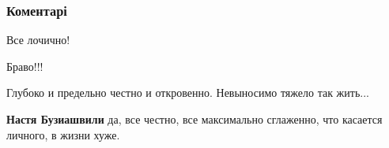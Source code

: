  
 
 
 
 
\subsubsection{Коментарі}
\label{sec:02_08_2021.fb.bilchenko_evgenia.5.kontr_kultura.cmt}

\begin{itemize}
 
Все лочично!

 
Браво!!!

 
Глубоко и предельно честно и откровенно. Невыносимо тяжело так жить...

\begin{itemize}
 
\textbf{Настя Бузиашвили} да, все честно, все максимально сглаженно, что касается личного, в жизни хуже.
\end{itemize}

 


\end{itemize}
